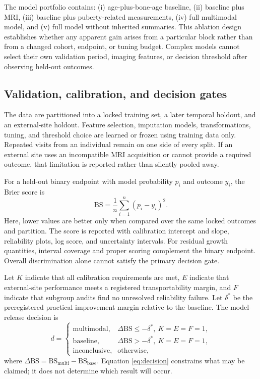 \documentclass[conference]{IEEEtran}
\begin{document}
The model portfolio contains: (i) age-plus-bone-age baseline, (ii) baseline plus MRI, (iii) baseline plus puberty-related measurements, (iv) full multimodal model, and (v) full model without inherited summaries. This ablation design establishes whether any apparent gain arises from a particular block rather than from a changed cohort, endpoint, or tuning budget. Complex models cannot select their own validation period, imaging features, or decision threshold after observing held-out outcomes.

\subsection{Validation, calibration, and decision gates}

The data are partitioned into a locked training set, a later temporal holdout, and an external-site holdout. Feature selection, imputation models, transformations, tuning, and threshold choice are learned or frozen using training data only. Repeated visits from an individual remain on one side of every split. If an external site uses an incompatible MRI acquisition or cannot provide a required outcome, that limitation is reported rather than silently pooled away.

For a held-out binary endpoint with model probability $p_i$ and outcome $y_i$, the Brier score is
\begin{equation}
\mathrm{BS}=\frac{1}{n}\sum_{i=1}^{n}(p_i-y_i)^2.
\label{eq:brier}
\end{equation}
Here, lower values are better only when compared over the same locked outcomes and partition. The score is reported with calibration intercept and slope, reliability plots, log score, and uncertainty intervals. For residual growth quantities, interval coverage and proper scoring complement the binary endpoint. Overall discrimination alone cannot satisfy the primary decision gate.

Let $K$ indicate that all calibration requirements are met, $E$ indicate that external-site performance meets a registered transportability margin, and $F$ indicate that subgroup audits find no unresolved reliability failure. Let $\delta^*$ be the preregistered practical improvement margin relative to the baseline. The model-release decision is
\begin{equation}
d=\begin{cases}
\text{multimodal}, & \Delta\mathrm{BS}\leq-\delta^*,\ K=E=F=1,\\
\text{baseline}, & \Delta\mathrm{BS}>-\delta^*,\ K=E=F=1,\\
\text{inconclusive}, & \text{otherwise},
\end{cases}
\label{eq:decision}
\end{equation}
where $\Delta\mathrm{BS}=\mathrm{BS}_{\mathrm{multi}}-\mathrm{BS}_{\mathrm{base}}$. Equation \eqref{eq:decision} constrains what may be claimed; it does not determine which result will occur.
\end{document}
